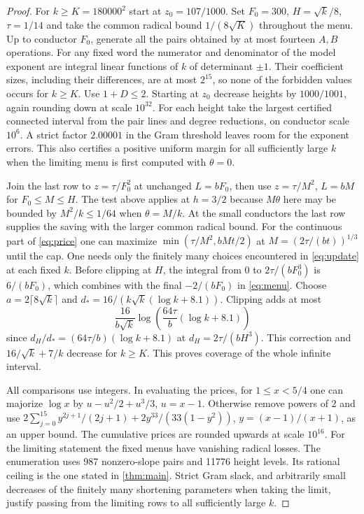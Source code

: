 \documentclass[11pt,letterpaper]{article}
\theoremstyle{definition}
\begin{document}
\begin{proof}
For $k\ge K=180000^2$ start at $z_0=107/1000$. Set
$F_0=300$, $H=\sqrt k/8$, $\tau=1/14$ and take the common radical
bound $1/(8\sqrt K)$ throughout the menu. Up to conductor $F_0$,
generate all the pairs obtained by at most fourteen $A,B$ operations.
For any fixed word the numerator and denominator of the model exponent
are integral linear functions of $k$ of determinant $\pm1$.
Their coefficient sizes, including their differences, are at most
$2^{15}$, so none of the forbidden values occurs for $k\ge K$.
Use $1+D\le2$. Starting at $z_0$ decrease heights by $1000/1001$,
again rounding down at scale $10^{32}$. For each height take the largest
certified connected interval from the pair lines and degree reductions,
on conductor scale $10^6$. A strict factor $2.00001$ in the Gram
threshold leaves room for the exponent errors. This also certifies a
positive uniform margin for all sufficiently large $k$ when the
limiting menu is first computed with $\theta=0$.

Join the last row to $z=\tau/F_0^2$ at unchanged $L=bF_0$,
then use $z=\tau/M^2$, $L=bM$ for $F_0\le M\le H$. The test above
applies at $h=3/2$ because $M\theta$ here may be bounded by
$M^2/k\le1/64$ when $\theta=M/k$. At the small conductors the
last row supplies the saving with the larger common radical bound.
For the continuous part of \eqref{eq:price} one can maximize
$\min(\tau/M^2,bMt/2)$ at $M=(2\tau/(bt))^{1/3}$ until the cap.
One needs only the finitely many choices encountered in
\eqref{eq:update} at each fixed $k$. Before clipping at $H$, the
integral from $0$ to $2\tau/(bF_0^3)$ is $6/(bF_0)$, which combines
with the final $-2/(bF_0)$ in \eqref{eq:menu}. Choose
$a=2\lceil8\sqrt k\rceil$ and
$d_*=16/(k\sqrt k(\log k+8.1))$. Clipping adds at most
\[
 \frac{16}{b\sqrt k}\log\!\left(\frac{64\tau}{b}
                  (\log k+8.1)\right)
\]
since $d_H/d_*=(64\tau/b)(\log k+8.1)$ at
$d_H=2\tau/(bH^3)$. This correction and $16/\sqrt k+7/k$ decrease for
$k\ge K$. This proves coverage of the whole infinite interval.

All comparisons use integers. In evaluating the prices, for $1\le x<5/4$
one can majorize $\log x$ by $u-u^2/2+u^3/3$, $u=x-1$. Otherwise remove
powers of $2$ and use
$2\sum_{j=0}^{15}y^{2j+1}/(2j+1)+2y^{33}/(33(1-y^2))$,
$y=(x-1)/(x+1)$, as an upper bound. The cumulative prices are rounded
upwards at scale $10^{16}$. For the limiting statement the fixed menus
have vanishing radical losses. The enumeration uses 987 nonzero-slope
pairs and 11776 height levels. Its rational ceiling is the one stated
in \cref{thm:main}. Strict Gram slack, and arbitrarily small decreases
of the finitely many shortening parameters when taking the limit,
justify passing from the limiting rows to all sufficiently large $k$.
\end{proof}
\end{document}
